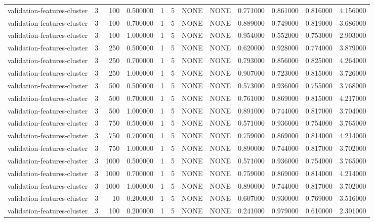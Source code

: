 \begin{tabular}{lrrrllllrrrr}
validation-features-cluster & 3 & 100 & 0.500000 & 1 & 5 & NONE & NONE & 0.771000 & 0.861000 & 0.816000 & 4.156000 \\
validation-features-cluster & 3 & 100 & 0.700000 & 1 & 5 & NONE & NONE & 0.889000 & 0.749000 & 0.819000 & 3.686000 \\
validation-features-cluster & 3 & 100 & 1.000000 & 1 & 5 & NONE & NONE & 0.954000 & 0.552000 & 0.753000 & 2.903000 \\
validation-features-cluster & 3 & 250 & 0.500000 & 1 & 5 & NONE & NONE & 0.620000 & 0.928000 & 0.774000 & 3.879000 \\
validation-features-cluster & 3 & 250 & 0.700000 & 1 & 5 & NONE & NONE & 0.793000 & 0.856000 & 0.825000 & 4.264000 \\
validation-features-cluster & 3 & 250 & 1.000000 & 1 & 5 & NONE & NONE & 0.907000 & 0.723000 & 0.815000 & 3.726000 \\
validation-features-cluster & 3 & 500 & 0.500000 & 1 & 5 & NONE & NONE & 0.573000 & 0.936000 & 0.755000 & 3.768000 \\
validation-features-cluster & 3 & 500 & 0.700000 & 1 & 5 & NONE & NONE & 0.761000 & 0.869000 & 0.815000 & 4.217000 \\
validation-features-cluster & 3 & 500 & 1.000000 & 1 & 5 & NONE & NONE & 0.891000 & 0.744000 & 0.817000 & 3.704000 \\
validation-features-cluster & 3 & 750 & 0.500000 & 1 & 5 & NONE & NONE & 0.571000 & 0.936000 & 0.754000 & 3.765000 \\
validation-features-cluster & 3 & 750 & 0.700000 & 1 & 5 & NONE & NONE & 0.759000 & 0.869000 & 0.814000 & 4.214000 \\
validation-features-cluster & 3 & 750 & 1.000000 & 1 & 5 & NONE & NONE & 0.890000 & 0.744000 & 0.817000 & 3.702000 \\
validation-features-cluster & 3 & 1000 & 0.500000 & 1 & 5 & NONE & NONE & 0.571000 & 0.936000 & 0.754000 & 3.765000 \\
validation-features-cluster & 3 & 1000 & 0.700000 & 1 & 5 & NONE & NONE & 0.759000 & 0.869000 & 0.814000 & 4.214000 \\
validation-features-cluster & 3 & 1000 & 1.000000 & 1 & 5 & NONE & NONE & 0.890000 & 0.744000 & 0.817000 & 3.702000 \\
validation-features-cluster & 3 & 10 & 0.200000 & 1 & 5 & NONE & NONE & 0.607000 & 0.930000 & 0.769000 & 3.516000 \\
validation-features-cluster & 3 & 100 & 0.200000 & 1 & 5 & NONE & NONE & 0.241000 & 0.979000 & 0.610000 & 2.301000 \\

\end{tabular}
